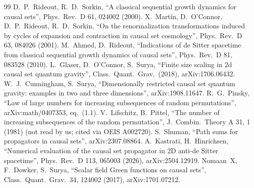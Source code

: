 \documentclass[11pt,a4paper]{article}
\begin{document}
\begin{thebibliography}{99}
 D.~P.~Rideout, R.~D.~Sorkin, ``A classical sequential growth dynamics for causal sets'', Phys.\ Rev.\ D 61, 024002 (2000).
 X.~Mart\'in, D.~O'Connor, D.~P.~Rideout, R.~D.~Sorkin, ``On the renormalization transformations induced by cycles of expansion and contraction in causal set cosmology'', Phys.\ Rev.\ D 63, 084026 (2001).
 M.~Ahmed, D.~Rideout, ``Indications of de Sitter spacetime from classical sequential growth dynamics of causal sets'', Phys.\ Rev.\ D 81, 083528 (2010).
 L.~Glaser, D.~O'Connor, S.~Surya, ``Finite size scaling in 2d causal set quantum gravity'', Class.\ Quant.\ Grav.\ (2018), arXiv:1706.06432.
 W.~J.~Cunningham, S.~Surya, ``Dimensionally restricted causal set quantum gravity: examples in two and three dimensions'', arXiv:1908.11647.
 R.~G.~Pinsky, ``Law of large numbers for increasing subsequences of random permutations'', arXiv:math/0407353, eq.~(1.1).
 V.~Lifschitz, B.~Pittel, ``The number of increasing subsequences of the random permutation'', J.\ Combin.\ Theory A 31, 1 (1981) (not read by us; cited via OEIS A002720).
 S.~Shuman, ``Path sums for propagators in causal sets'', arXiv:2307.08864.
 A.~Kastrati, H.~Hinrichsen, ``Numerical evaluation of the causal set propagator in 2D anti-de Sitter spacetime'', Phys.\ Rev.\ D 113, 065003 (2026), arXiv:2504.12919.
 Nomaan~X, F.~Dowker, S.~Surya, ``Scalar field Green functions on causal sets'', Class.\ Quant.\ Grav.\ 34, 124002 (2017), arXiv:1701.07212.
\end{thebibliography}
\end{document}
